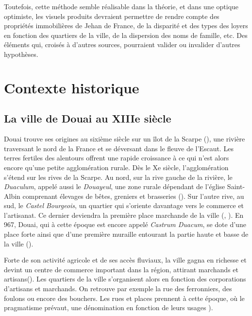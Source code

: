 Toutefois, cette méthode semble réalisable dans la théorie, et dans une optique optimiste,  les visuels produits devraient permettre de rendre compte des propriétés immobilières de Jehan de France, de la disparité et des types des loyers en fonction des quartiers de la ville, de la dispersion des noms de famille, etc. Des éléments qui, croisés  à d'autres sources, pourraient valider ou invalider d'autres hypothèses. 

\section{Contexte historique}
\subsection{La ville de Douai au XIIIe siècle}

Douai trouve ses origines au sixième siècle sur un îlot de la Scarpe (\cite{mestayer_douai_2016}), une rivière traversant le nord de la France et se déversant dans le fleuve de l'Escaut. Les terres fertiles des alentours offrent une rapide croissance à ce qui n'est alors encore qu'une petite agglomération rurale. Dès le Xe siècle, l'agglomération s'étend sur les rives de la Scarpe. Au nord, sur la rive gauche de la rivière, le \textit{Duaculum}, appelé aussi le \textit{Douayeul}, une zone rurale dépendant de l'église Saint-Albin comprenant élevages de bêtes, greniers et brasseries (\cite{mestayer_douai_2016}). Sur l'autre rive, au sud, le \textit{Castel Bourgeois}, un quartier qui s'oriente davantage vers le commerce et l'artisanat. Ce dernier deviendra la première place marchande de la ville (\cite{officedutourisme_douai_2016}, \cite{netteghem_histoire_2021}). En 967, Douai, qui à cette époque est encore appelé \textit{Castrum Duacum}, se dote d'une place forte ainsi que d'une première muraille entourant la partie haute et basse de la ville (\cite{mestayer_douai_2016}). 

Forte de son activité agricole et de ses accès fluviaux, la ville gagna en richesse et devint un centre de commerce important dans la région, attirant marchands et artisans(\cite{clisant_vie_2003}). Les quartiers de la ville s'organisent alors en fonction des corporations d'artisans et marchands. On retrouve par exemple la rue des ferronniers, des foulons ou encore des bouchers. Les rues et places prennent à cette époque, où le pragmatisme  prévaut, une dénomination en fonction de leurs usages \cite{colin_decouvrez_2001}). 

